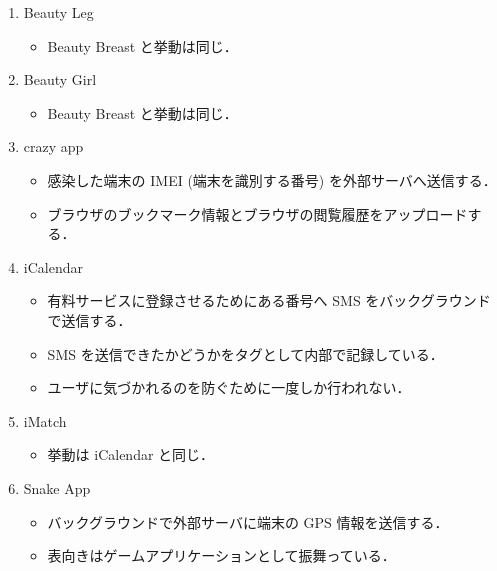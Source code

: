 \begin{enumerate}
\item Beauty Leg
	\begin{itemize}
	\item Beauty Breast と挙動は同じ．
	\end{itemize}

\item Beauty Girl
	\begin{itemize}
	\item Beauty Breast と挙動は同じ．
	\end{itemize}

\item crazy app
	\begin{itemize}
	\item 感染した端末の IMEI (端末を識別する番号) を外部サーバへ送信する．
	\item  ブラウザのブックマーク情報とブラウザの閲覧履歴をアップロードする．
	\end{itemize}
\item iCalendar
	\begin{itemize}
	\item 有料サービスに登録させるためにある番号へ SMS をバックグラウンドで送信する．
	\item SMS  を送信できたかどうかをタグとして内部で記録している．
	\item ユーザに気づかれるのを防ぐために一度しか行われない．
	\end{itemize}
	
\item iMatch
	\begin{itemize}
	\item 挙動は iCalendar と同じ．
	\end{itemize}
	
\item Snake App
	\begin{itemize}
	\item バックグラウンドで外部サーバに端末の GPS 情報を送信する．
	\item 表向きはゲームアプリケーションとして振舞っている．
	\end{itemize}
	


\end{enumerate}

